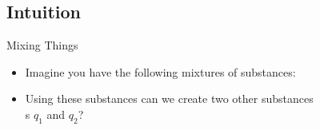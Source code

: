 \documentclass{beamer}
\begin{document}
\subsection{Intuition}

\begin{frame}{Mixing Things}
    \begin{itemize}
        \item Imagine you have the following 
        mixtures of substances:
    \end{itemize}
    
        \begin{table}[h]
            \centering
        \end{table}
    \begin{itemize}
        \item Using these substances can we create two other substances \\s $q_1$ and $q_2$?
    \end{itemize}
    \begin{table}[h]
            \centering
        \end{table}
\end{frame}
\end{document}
